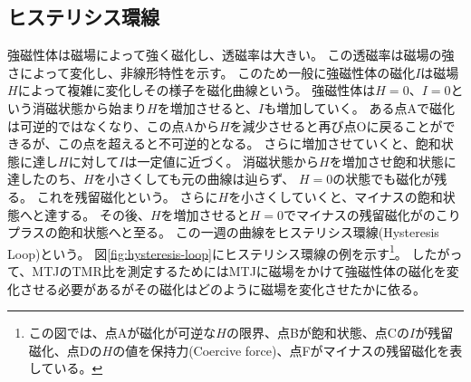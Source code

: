 \documentclass[../../../main]{subfiles}
\begin{document}


\subsection{ヒステリシス環線}\label{subsec:hysteresis-loop}
強磁性体は磁場によって強く磁化し、透磁率は大きい。
この透磁率は磁場の強さによって変化し、非線形特性を示す。
このため一般に強磁性体の磁化$I$は磁場$H$によって複雑に変化しその様子を磁化曲線という。
強磁性体は$H=0$、$I=0$という消磁状態から始まり$H$を増加させると、$I$も増加していく。
ある点Aで磁化は可逆的ではなくなり、この点Aから$H$を減少させると再び点Oに戻ることができるが、この点を超えると不可逆的となる。
さらに増加させていくと、飽和状態に達し$H$に対して$I$は一定値に近づく。
消磁状態から$H$を増加させ飽和状態に達したのち、$H$を小さくしても元の曲線は辿らず、
$H=0$の状態でも磁化が残る。
これを残留磁化という。
さらに$H$を小さくしていくと、マイナスの飽和状態へと達する。
その後、$H$を増加させると$H=0$でマイナスの残留磁化がのこりプラスの飽和状態へと至る。
この一週の曲線をヒステリシス環線(Hysteresis Loop)という。\cite{ferromagnetic}
図\ref{fig:hysteresis-loop}にヒステリシス環線の例を示す\footnote{
	この図では、点Aが磁化が可逆な$H$の限界、点Bが飽和状態、点Cの$I$が残留磁化、点Dの$H$の値を保持力(Coercive force)、点Fがマイナスの残留磁化を表している。
}。
したがって、MTJのTMR比を測定するためにはMTJに磁場をかけて強磁性体の磁化を変化させる必要があるがその磁化はどのように磁場を変化させたかに依る。

\end{document}
